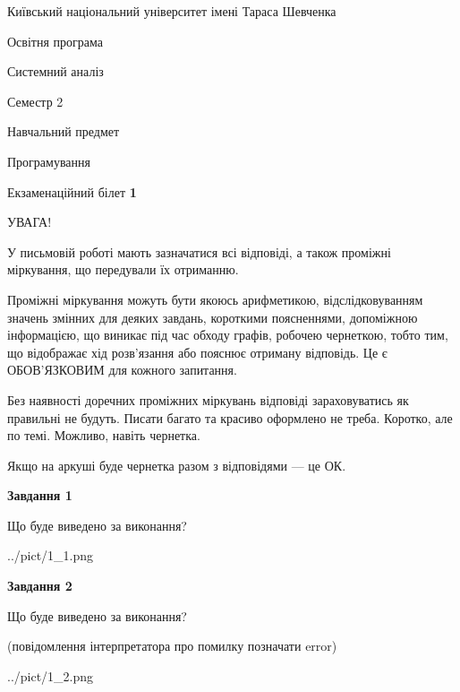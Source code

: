 \documentclass[12pt, ukrainian]{article}
\begin{document}
{{\begin {small}\par
{ \center  Київський національний університет імені Тараса Шевченка \par}
{\parbox {5 cm}{Освітня програма \hfill}{\parbox {7 cm}{Системний аналіз \hfill}}\parbox {6 cm}{\hfill Семестр 2}}\par
{\parbox {5 cm} {Навчальний предмет \hfill}\parbox {7 cm}{Програмування \hfill}\parbox {6cm}{\hfill}\par}\vspace{-7pt} \end{small}}{\center Екзаменаційний білет \No \textbf
{ 1 }\par}}
{
\begin {large}
УВАГА!

У письмовій роботі мають зазначатися всі відповіді, а також проміжні міркування, що передували їх отриманню.

Проміжні міркування можуть бути якоюсь арифметикою, відслідковуванням зна\-чень змінних для деяких завдань,
короткими поясненнями, допоміжною інформацією, що виникає під час обходу графів, робочею чернеткою,
тобто тим, що відображає хід розв’язання або пояснює отриману відповідь.
Це є ОБОВ’ЯЗКОВИМ для кожного запитання.

Без наявності доречних проміжних міркувань відповіді зараховуватись як правиль\-ні не будуть.
Писати багато та красиво оформлено не треба. Коротко, але по темі. Можли\-во, навіть чернетка.

Якщо на аркуші буде чернетка разом з відповідями --- це ОК.

\newpage

{\begin {center}\textbf{Завдання 1}\end {center}}\par
Що буде виведено за виконання?\par
\begin{center}
	{../pict/1_1.png}
\end{center}
\newpage

{\begin {center}\textbf{Завдання 2}\end {center}}\par
Що буде виведено за виконання?\par
 (повідомлення інтерпретатора про помилку позначати error)\par
\begin{center}
	{../pict/1_2.png}
\end{center}
\newpage


\end{large}}
\end{document}
